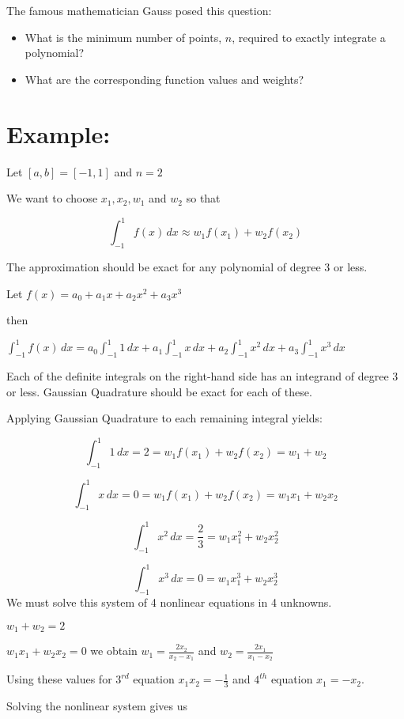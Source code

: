 \documentclass[11pt]{article}
\begin{document}
The famous mathematician Gauss posed this question:

\begin{itemize}
\item
  What is the minimum number of points, \(n\), required to exactly
  integrate a polynomial?
\item
  What are the corresponding function values and weights?
\end{itemize}

    \section{Example:}\label{example}

Let \([a, b] = [-1, 1]\) and \(n=2\)

We want to choose \(x_1, x_2, w_1\) and \(w_2\) so that

\[     \int_{-1}^1 f(x)\,dx \approx w_1 f(x_1) + w_2 f(x_2)\]

The approximation should be exact for any polynomial of degree 3 or
less.

    Let \(f(x) = a_0 + a_1x+a_2x^2+a_3x^3\)

then

\(\int_{-1}^1 f(x)\,dx = a_0\int_{-1}^1 1\,dx+a_1\int_{-1}^1 x\,dx+a_2\int_{-1}^1 x^2\,dx+a_3\int_{-1}^1 x^3\,dx\)

Each of the definite integrals on the right-hand side has an integrand
of degree 3 or less. Gaussian Quadrature should be exact for each of
these.

    Applying Gaussian Quadrature to each remaining integral yields:

\[\int_{-1}^1 1\,dx = 2 = w_1f(x_1) + w_2f(x_2)=w_1 + w_2\]

    \[\int_{-1}^1 x \,dx = 0 = w_1f(x_1) + w_2f(x_2)= w_1 x_1 +w_2 x_2\]

    \[\int_{-1}^1 x^2\,dx = \frac{2}{3} = w_1 x_1^2+w_2x_2^2\]

    \[ \int_{-1}^1 x^3\,dx = 0 =  w_1x_1^3 +w_2 x_2^3\] We must solve this
system of 4 nonlinear equations in 4 unknowns.

    \(w_1 + w_2 = 2\)

\(w_1 x_1 +w_2 x_2 = 0\) we obtain \(w_1 = \frac{2x_2}{x_2-x_1}\) and
\(w_2 = \frac{2x_1}{x_1-x_2}\)

Using these values for \(3^{rd}\) equation \(x_1 x_2 =-\frac{1}{3}\) and
\(4^{th}\) equation \(x_1 = -x_2\).

    Solving the nonlinear system gives us
\end{document}
